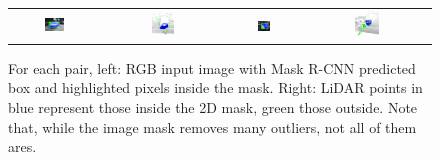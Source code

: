 \begin{figure}
    \centering
    \begin{tabular}{c c c c}
         \includegraphics[width=0.25\textwidth]{figures/method/examples/rgb-2.png}
        &\includegraphics[width=0.2\textwidth]{figures/method/examples/pcd-2.png} &
         \includegraphics[width=0.2\textwidth]{figures/method/examples/rgb-4.png}
        &\includegraphics[width=0.2\textwidth]{figures/method/examples/pcd-4.png} \\
    \end{tabular}
    \caption{
    For each pair, left: RGB input image with Mask R-CNN predicted box and highlighted pixels inside the mask.
    Right: LiDAR points in blue represent those inside the 2D mask, green those outside.
    Note that, while the image mask removes many outliers, not all of them ares.}\label{fig:dataset_example}
\end{figure}
